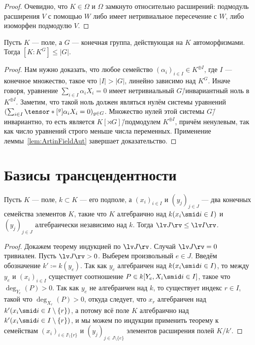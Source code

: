 \documentclass[
	extrafontsizes,
	11pt,
	hyphens,
]{memoir}
\begin{document}
\begin{proof}
Очевидно, что \(K \in \Omega\)
и \(\Omega\) замкнуто относительно расширений: подмодуль расширения \(V\) с помощью \(W\) либо имеет нетривиальное пересечение с \(W\), либо изоморфен подмодулю \(V\).
\end{proof}

\begin{theorem}
Пусть \(K\) --- поле, а \(G\) --- конечная группа, действующая на \(K\) автоморфизмами.
Тогда \([K : K^G] \leq \lvert G \rvert\).
\end{theorem}

\begin{proof}
Нам нужно доказать, что любое семейство \((\alpha_i)_{i \in I} \in K^{\oplus I}\), где \(I\) --- конечное множество, такое что \(\lvert I \rvert > \lvert G \rvert\), линейно зависимо над \(K^G\).
Иначе говоря, уравнение \(\sum_{i \in I} \alpha_i X_i = 0\) имеет нетривиальный \(G\)\=/инвариантный ноль в \(K^{\oplus I}\).
Заметим, что такой ноль должен являться нулём системы уравнений 
\(
(\sum_{i \in I} \tensor*[^g]{{\alpha_i}}{} X_i = 0)_{g \in G}
\).
Множество нулей этой системы \(G\)\=/инвариантно, то есть является \(K[\rtimes G]\)\=/подмодулем \(K^{\oplus I}\), причём ненулевым, так как число уравнений строго меньше числа переменных.
Применение леммы~\ref{lem:ArtinFieldAut} завершает доказательство.
\end{proof}


\section{Базисы трансцендентности}

\begin{theorem}
Пусть \(K\) --- поле, \(k \subset K\) --- его подполе,
а \((x_i)_{i \in I}\) и \((y_j)_{j \in J}\) --- два конечных семейства элементов \(K\), такие что \(K\) алгебраично над \(k(x_i \smid i \in I)\) и \((y_j)_{j \in J}\) алгебраически независимо над \(k\).
\label{thm:TranscendenceBasesFundResult1}
Тогда \(\lv J \rv \leq \lv I \rv\).
\end{theorem}

\begin{proof}
Докажем теорему индукцией по \(\lv J \rv\).
Случай \(\lv J \rv = 0\) тривиален.
Пусть \(\lv J \rv > 0\).
Выберем произвольный \(e \in J\).
Введём обозначение \(k' \coloneqq k(y_e)\).
Так как \(y_e\) алгебраичен над \(k(x_i \smid i \in I)\), то между \(y_e\) и \((x_i)_{i \in I}\) существует соотношение \(P \in k[Y_e, X_i \smid i \in I]\), такое что \(\deg_{Y_e}(P) > 0\).
Так как \(y_e\) не алгебраичен над \(k\), то существует индекс \(r \in I\), такой что \(\deg_{X_r}(P) > 0\),
откуда следует, что \(x_r\) алгебраичен над \(k'(x_i \smid i \in I \setminus \{r\})\), а потому всё поле \(K\) алгебраично над \(k'(x_i \smid i \in I \setminus \{r\})\), и мы можем по индукции применить теорему к семействам \((x_i)_{i \in I \setminus \{r\}}\) и \((y_j)_{j \in J \setminus \{e\}}\) элементов расширения полей \(K / k'\).
\end{proof}
\end{document}
